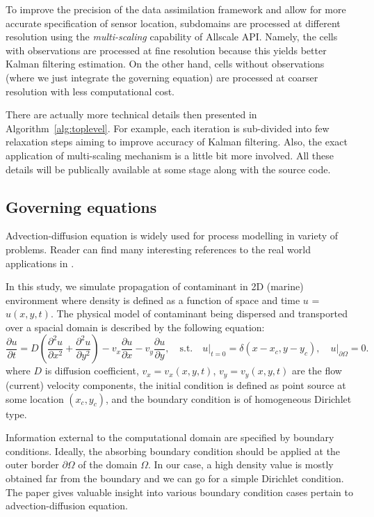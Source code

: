 \documentclass[acmsmall,review,anonymous]{acmart}\settopmatter{printfolios=true,printccs=false,printacmref=false}
\begin{document}
To improve the precision of the data assimilation framework and allow for more accurate specification of sensor location, subdomains are processed at different resolution using the \textit{multi-scaling} capability of Allscale API. Namely, the cells with observations are processed at fine resolution because this yields better Kalman filtering estimation. On the other hand, cells without observations (where we just integrate the governing equation) are processed at coarser resolution with less computational cost. 

There are actually more technical details then presented in Algorithm~\ref{alg:toplevel}. For example, each iteration is sub-divided into few relaxation steps aiming to improve accuracy of Kalman filtering. Also, the exact application of multi-scaling mechanism is a little bit more involved. All these details will be publically available at some stage along with the source code. 

\subsection{Governing equations}

Advection-diffusion equation is widely used for process modelling in variety of problems. Reader can find many interesting references to the real world applications in \cite{Miyaoka17}.

In this study, we simulate propagation of contaminant in 2D (marine) environment where density is defined as a function of space and time $u$ = $u(x,y,t)$. The physical model of contaminant being dispersed and transported over a spacial domain is described by the following equation:
\begin{equation}
\frac{\partial u}{\partial t} =
D \left(\frac{\partial^2 u}{\partial x^2} + \frac{\partial^2 u}{\partial y^2}\right)
- v_x \frac{\partial u}{\partial x}
- v_y \frac{\partial u}{\partial y},
\,\,\,\,\,\,\mbox{s.t.}\,\,\,\,\,\,
u\rvert_{t=0} = \delta(x\!-\!x_c,y\!-\!y_c),
\,\,\,\,\,\,u\rvert_{\partial\Omega}=0.
\label{eq:pde}
\end{equation}
where $D$ is diffusion coefficient, $v_x = v_x(x,y,t)$, $v_y = v_y(x,y,t)$ are the flow (current) velocity components, the initial condition is defined as point source at some location $(x_c,y_c)$, and the boundary condition is of homogeneous Dirichlet type.

Information external to the computational domain are specified by boundary conditions. Ideally, the absorbing boundary condition should be applied at the outer border $\partial\Omega$ of the domain $\Omega$. In our case, a high density value is mostly obtained far from the boundary and we can go for a simple Dirichlet condition. The paper \cite{Miyaoka17} gives valuable insight into various boundary condition cases pertain to advection-diffusion equation.
\end{document}
